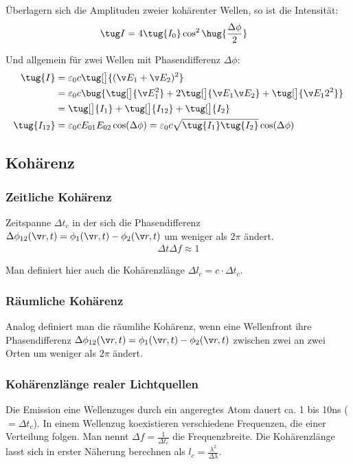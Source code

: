 \documentclass[twocolumn, unnumberedsubsub]{summery_3.1}
\begin{document}
Überlagern sich die Amplituden zweier kohärenter Wellen, so ist die 
Intensität:
\begin{align*}
    \tug I &= 4 \tug{I_0} \cos^2 \hug{\frac{\Delta \phi}{2}}
\end{align*}
 
Und allgemein für zwei Wellen mit Phasendifferenz \(\Delta\phi\):
\begin{align*}
    \tug{I} &= \varepsilon_0 c \tug[\big]{(\v E_1 + \v E_2)^2}\\
    &= \varepsilon_0 c \bug{\tug[\big]{\v E_1^2} + 2\tug[\big]{\v E_1 \v E_2} + \tug[\big]{\v E_12^2}}\\
    &= \tug[\big]{I_1} + \tug[\big]{I_{12}} + \tug[\big]{I_2}\\
    \tug{I_{12}} &= \varepsilon_0 c E_{01} E_{02} \cos(\Delta \phi)
    = \varepsilon_0 c \sqrt{\tug{I_1}\tug{I_2}} \cos(\Delta \phi)
\end{align*}

\subsection{Kohärenz}
\subsubsection*{Zeitliche Kohärenz}
Zeitspanne \(\Delta t_c\) in der sich die Phasendifferenz 
\(\Delta\phi_{12}(\v r, t) = \phi_1(\v r, t) - \phi _2(\v r, t)\) um weniger als
\(2\pi\) ändert. 
\begin{align*}
    \Delta t \Delta f \approx 1
\end{align*}

Man definiert hier auch die Kohärenzlänge \(\Delta l_c= c\cdot \Delta t_c\).

\subsubsection*{Räumliche Kohärenz}
Analog definiert man die räumlihe Kohärenz, wenn eine Wellenfront ihre Phasendifferenz
\(\Delta\phi_{12}(\v r, t) = \phi_1(\v r, t) - \phi _2(\v r, t)\) zwischen zwei 
an zwei Orten um weniger als \(2\pi\) ändert.

\subsubsection*{Kohärenzlänge realer Lichtquellen}
Die Emission eine Wellenzuges durch ein angeregtes Atom dauert ca. 1 bis 10ns 
(\(=\Delta t_c\)). In einem Wellenzug koexistieren verschiedene Frequenzen, die einer 
Verteilung folgen. Man nennt \(\Delta f = \frac 1{\Delta t_c}\) die Frequenzbreite.
Die Kohärenzlänge lasst sich in erster Näherung berechnen als 
\(l_c = \frac{\lambda^2}{\Delta \lambda}\).
\end{document}
